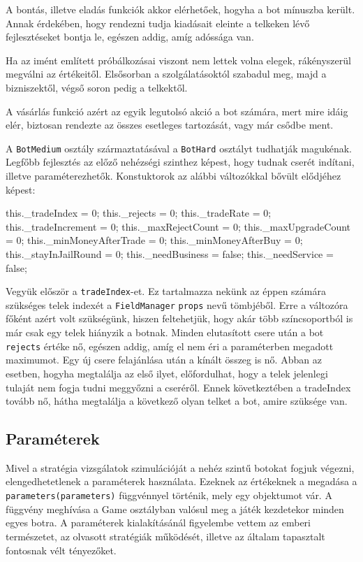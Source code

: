 A bontás, illetve eladás funkciók akkor elérhetőek, hogyha a bot mínuszba került.  Annak érdekében, hogy rendezni tudja kiadásait eleinte a telkeken lévő fejlesztéseket bontja le, egészen addig, amíg adóssága van.

Ha az imént említett próbálkozásai viszont nem lettek volna elegek, rákényszerül megválni az értékeitől. Elsősorban a szolgálatásoktól szabadul meg, majd a bizniszektől, végső soron pedig a telkektől.

A vásárlás funkció azért az egyik legutolsó akció a bot számára, mert mire idáig elér, biztosan rendezte az összes esetleges tartozását, vagy már csődbe ment.


A \texttt{BotMedium} osztály származtatásával a \texttt{BotHard} osztályt tudhatják magukénak. Legfőbb fejlesztés az előző nehézségi szinthez képest, hogy tudnak cserét indítani, illetve paraméterezhetők. Konstuktorok az alábbi változókkal bővült elődjéhez képest:
\begin{javascript}
  this._tradeIndex = 0;
  this._rejects = 0;
  this._tradeRate = 0;
  this._tradeIncrement = 0;
  this._maxRejectCount = 0;
  this._maxUpgradeCount = 0;
  this._minMoneyAfterTrade = 0;
  this._minMoneyAfterBuy = 0;
  this._stayInJailRound = 0;
  this._needBusiness = false;
  this._needService = false;
\end{javascript}

Vegyük először a \texttt{tradeIndex}-et. Ez tartalmazza nekünk az éppen számára szükséges telek indexét a \texttt{FieldManager} \texttt{props} nevű tömbjéből. Erre a változóra főként azért volt szükségünk, hiszen feltehetjük, hogy akár több színcsoportból is már csak egy telek hiányzik a botnak. Minden elutasított csere után a bot \texttt{rejects} értéke nő, egészen addig, amíg el nem éri a paraméterben megadott maximumot. Egy új csere felajánlása után a kínált összeg is nő. Abban az esetben, hogyha megtalálja az első ilyet, előfordulhat, hogy a telek jelenlegi tulaját nem fogja tudni meggyőzni a cseréről. Ennek következtében a tradeIndex tovább nő, hátha megtalálja a következő olyan telket a bot, amire szüksége van.

\subsection{Paraméterek}

Mivel a stratégia vizsgálatok szimulációját a nehéz szintű botokat fogjuk végezni, elengedhetetlenek a paraméterek használata. Ezeknek az értékeknek a megadása a \texttt{parameters(parameters)} függvénnyel történik, mely egy objektumot vár. A függvény meghívása a Game osztályban valósul meg a játék kezdetekor minden egyes botra. A paraméterek kialakításánál figyelembe vettem az emberi természetet, az olvasott stratégiák működését, illetve az általam tapasztalt fontosnak vélt tényezőket.

